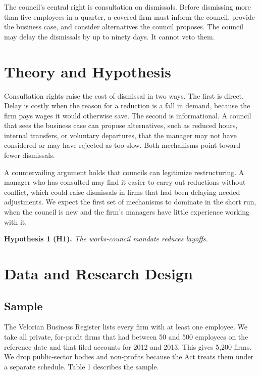 \documentclass[12pt]{article}
\begin{document}
The council's central right is consultation on dismissals. Before dismissing more than five employees in a quarter, a covered firm must inform the council, provide the business case, and consider alternatives the council proposes. The council may delay the dismissals by up to ninety days. It cannot veto them.

\section{Theory and Hypothesis}

Consultation rights raise the cost of dismissal in two ways. The first is direct. Delay is costly when the reason for a reduction is a fall in demand, because the firm pays wages it would otherwise save. The second is informational. A council that sees the business case can propose alternatives, such as reduced hours, internal transfers, or voluntary departures, that the manager may not have considered or may have rejected as too slow. Both mechanisms point toward fewer dismissals.

A countervailing argument holds that councils can legitimize restructuring. A manager who has consulted may find it easier to carry out reductions without conflict, which could raise dismissals in firms that had been delaying needed adjustments. We expect the first set of mechanisms to dominate in the short run, when the council is new and the firm's managers have little experience working with it.

\medskip
\noindent\textbf{Hypothesis 1 (H1).} \emph{The works-council mandate reduces layoffs.}

\section{Data and Research Design}

\subsection{Sample}

The Velorian Business Register lists every firm with at least one employee. We take all private, for-profit firms that had between 50 and 500 employees on the reference date and that filed accounts for 2012 and 2013. This gives 5,200 firms. We drop public-sector bodies and non-profits because the Act treats them under a separate schedule. Table 1 describes the sample.
\end{document}
